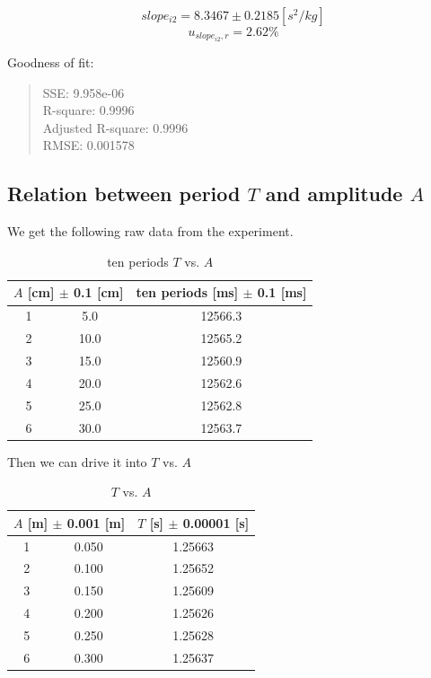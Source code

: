 $$slope_{i2} = 8.3467 \pm 0.2185 [s^2/kg] $$
$$ u_{slope_{i2},r} = 2.62 \% $$

Goodness of fit:
\begin{quote}
	\centering
  SSE: 9.958e-06 \\
  R-square: 0.9996 \\
  Adjusted R-square: 0.9996 \\
  RMSE: 0.001578 \\
\end{quote}


\subsection{Relation between period $T$ and amplitude $A$}

We get the following raw data from the experiment.
\begin{table}[H]
	\centering
	\begin{tabular}{|c|c|c|}
	\hline
	\multicolumn{2}{|c|}{ $A$ [cm] $\pm$ 0.1 [cm]} & ten periods [ms] $\pm$ 0.1 [ms] \\ \hline
	1 &  5.0 & 12566.3 \\ \hline
	2 & 10.0 & 12565.2 \\ \hline
	3 & 15.0 & 12560.9 \\ \hline
	4 & 20.0 & 12562.6 \\ \hline
	5 & 25.0 & 12562.8 \\ \hline
	6 & 30.0 & 12563.7 \\ \hline
	\end{tabular}
	\caption{ten periods $T$ vs. $A$}
\label{TvsAraw}
\end{table}

Then we can drive it into $T$ vs. $A$

\begin{table}[H]
	\centering
	\begin{tabular}{|c|c|c|}
	\hline
	\multicolumn{2}{|c|}{ $A$ [m] $\pm$ 0.001 [m]} & $T$ [s] $\pm$ 0.00001 [s] \\ \hline
	1 & 0.050 & 1.25663 \\ \hline
	2 & 0.100 & 1.25652 \\ \hline
	3 & 0.150 & 1.25609 \\ \hline
	4 & 0.200 & 1.25626 \\ \hline
	5 & 0.250 & 1.25628 \\ \hline
	6 & 0.300 & 1.25637 \\ \hline
	\end{tabular}
	\caption{$T$ vs. $A$}
\label{TvsA}
\end{table}


